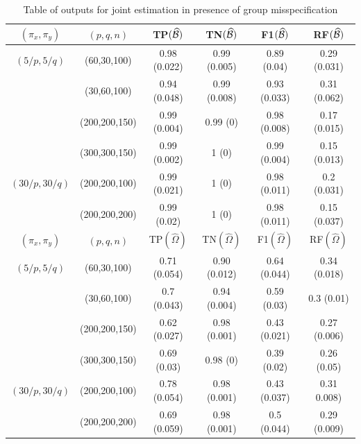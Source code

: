 \begin{scriptsize}
\begin{table}
\centering
    \begin{tabular}{cccccc}
    \hline
    $(\pi_x, \pi_y)$ & $(p,q,n)$   & TP$(\widehat {{\cal{B}}})$            & TN$(\widehat {{\cal{B}}})$             & F1$(\widehat {{\cal{B}}})$ & RF$(\widehat {{\cal{B}}})$    \\ \hline
    $(5/p, 5/q)$   & (60,30,100)   & 0.98 (0.022)  & 0.99 (0.005)   & 0.89 (0.04)   & 0.29 (0.031) \\
    ~              & (30,60,100)   & 0.94 (0.048)  & 0.99 (0.008)   & 0.93 (0.033)  & 0.31 (0.062) \\
    ~              & (200,200,150) & 0.99 (0.004)  & 0.99 (0)       & 0.98 (0.008)  & 0.17 (0.015) \\
    ~              & (300,300,150) & 0.99 (0.002)  & 1 (0)          & 0.99 (0.004)  & 0.15 (0.013) \\
    $(30/p, 30/q)$ & (200,200,100) & 0.99 (0.021)  & 1 (0)          & 0.98 (0.011)  & 0.2 (0.031)  \\
    ~              & (200,200,200) & 0.99 (0.02)   & 1 (0)          & 0.98 (0.011)  & 0.15 (0.037) \\\hline
    \hline
    $(\pi_x, \pi_y)$ & $(p,q,n)$   & TP$(\widehat \Omega)$            & TN$(\widehat \Omega)$             & F1$(\widehat \Omega)$ & RF$(\widehat \Omega)$            \\ \hline
    $(5/p, 5/q)$   & (60,30,100)   & 0.71 (0.054)  & 0.90 (0.012)   & 0.64 (0.044)  & 0.34 (0.018)\\
    ~              & (30,60,100)   & 0.7 (0.043)   & 0.94 (0.004)   & 0.59 (0.03)   & 0.3 (0.01)  \\
    ~              & (200,200,150) & 0.62 (0.027)  & 0.98 (0.001)   & 0.43 (0.021)  & 0.27 (0.006)\\
    ~              & (300,300,150) & 0.69 (0.03)   & 0.98 (0)       & 0.39 (0.02)   & 0.26 (0.05) \\
    $(30/p, 30/q)$ & (200,200,100) & 0.78 (0.054)  & 0.98 (0.001)   & 0.43 (0.037)  & 0.31 0.008) \\
    ~              & (200,200,200) & 0.69 (0.059)  & 0.98 (0.001)   & 0.5 (0.044)   & 0.29 (0.009)\\\hline
    \end{tabular}
    \caption{Table of outputs for joint estimation in presence of group misspecification}
    \label{table:simtable2}
\end{table}
\end{scriptsize}

